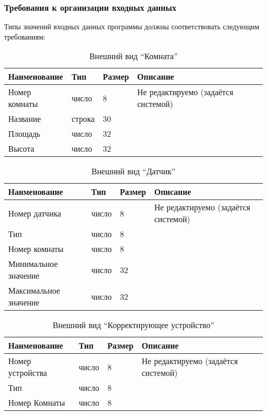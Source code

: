     \subsubsection{Требования к организации входных данных}
      Типы значений входных данных программы должны соответствовать следующим требованиям:
          \begin{table}[h!]
            \centering
            \caption{Внешний вид “Комната”}
            \label{room:size}
            \begin{tabular}{|l|l|l|l|}
            \hline
            Наименование & Тип & Размер & Описание \\ \hline
            Номер комнаты & число & 8 & Не редактируемо (задаётся системой) \\ \hline
            Название  & строка & 30 & \\ \hline
            Площадь  & число & 32 &  \\ \hline
            Высота    & число & 32 & \\ \hline
            \end{tabular}
          \end{table}
          \begin{table}[h!]
            \centering
            \caption{Внешний вид “Датчик”}
            \label{sensor:size}
            \begin{tabular}{|l|l|l|l|}
            \hline
            Наименование & Тип & Размер & Описание \\ \hline
            Номер датчика & число & 8 & Не редактируемо (задаётся системой)\\ \hline
            Тип & число & 8 & \\ \hline
            Номер комнаты   & число & 8 & \\ \hline
            Минимальное значение & число & 32 & \\ \hline
            Максимальное значение & число & 32 & \\ \hline
            \end{tabular}
          \end{table}
          \begin{table}[h!]
            \centering
            \caption{Внешний вид “Корректирующее устройство”}
            \label{sensor:size}
            \begin{tabular}{|l|l|l|l|}
            \hline
            Наименование & Тип & Размер & Описание \\ \hline
            Номер устройства & число & 8 & Не редактируемо (задаётся системой) \\ \hline
            Тип & число & 8 & \\ \hline
            Номер Комнаты & число & 8 & \\ \hline
            \end{tabular}
          \end{table}
          
